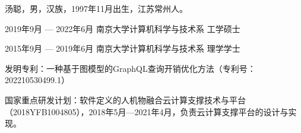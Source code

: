 \documentclass[winfonts,master,twoside]{njuthesis}
\begin{document}
\begin{resume}
\begin{authorinfo}
\noindent 汤聪，男，汉族，1997年11月出生，江苏常州人。
\end{authorinfo}
\begin{education}
\item[2019年9月 --- 2022年6月] 南京大学计算机科学与技术系 \hfill 工学硕士
\item[2015年9月 --- 2019年6月] 南京大学计算机科学与技术系 \hfill 理学学士
\end{education}
\begin{publications}
\item 发明专利：一种基于图模型的GraphQL查询开销优化方法（专利号：202210530499.1）
\end{publications}
\begin{projects}
\item 国家重点研发计划：软件定义的人机物融合云计算支撑技术与平台（2018YFB1004805），2018年5月—2021年4月，负责云计算支撑平台的设计与实现。
\end{projects}
\end{resume}

\makelicense

\end{document}
